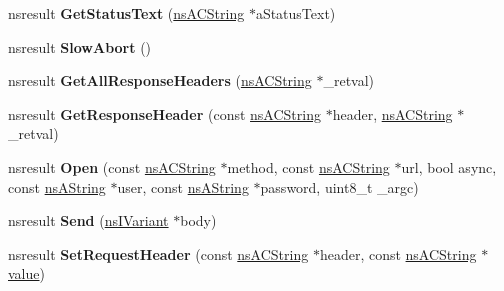 \begin{DoxyCompactItemize}
nsresult {\bfseries Get\+Status\+Text} (\hyperlink{structns_c_string_container}{ns\+A\+C\+String} $\ast$a\+Status\+Text)
\item 
\mbox{\label{interfacens_i_x_m_l_http_request_a9276d299aad0f31046fcf4e08374368f}} 
nsresult {\bfseries Slow\+Abort} ()
\item 
\mbox{\label{interfacens_i_x_m_l_http_request_a8aae5d349c54c9f1958d7d6eb3cc49e7}} 
nsresult {\bfseries Get\+All\+Response\+Headers} (\hyperlink{structns_c_string_container}{ns\+A\+C\+String} $\ast$\+\_\+retval)
\item 
\mbox{\label{interfacens_i_x_m_l_http_request_ad46c0abb2d4012247f55c62554627a79}} 
nsresult {\bfseries Get\+Response\+Header} (const \hyperlink{structns_c_string_container}{ns\+A\+C\+String} $\ast$header, \hyperlink{structns_c_string_container}{ns\+A\+C\+String} $\ast$\+\_\+retval)
\item 
\mbox{\label{interfacens_i_x_m_l_http_request_a2fb4c6c329fd5a16dec6fb1c5531b272}} 
nsresult {\bfseries Open} (const \hyperlink{structns_c_string_container}{ns\+A\+C\+String} $\ast$method, const \hyperlink{structns_c_string_container}{ns\+A\+C\+String} $\ast$url, bool async, const \hyperlink{structns_string_container}{ns\+A\+String} $\ast$user, const \hyperlink{structns_string_container}{ns\+A\+String} $\ast$password, uint8\+\_\+t \+\_\+argc)
\item 
\mbox{\label{interfacens_i_x_m_l_http_request_a5717e2ee4acadbdcaca5d36292fc221d}} 
nsresult {\bfseries Send} (\hyperlink{interfacens_i_variant}{ns\+I\+Variant} $\ast$body)
\item 
\mbox{\label{interfacens_i_x_m_l_http_request_a8338341c895d1c54e90582517a57d5fa}} 
nsresult {\bfseries Set\+Request\+Header} (const \hyperlink{structns_c_string_container}{ns\+A\+C\+String} $\ast$header, const \hyperlink{structns_c_string_container}{ns\+A\+C\+String} $\ast$\hyperlink{unionvalue}{value})
\item 
\mbox{\label{interfacens_i_x_m_l_http_request_a2e432b4d8279f3c1a0150c5424c63ac2}} 

\end{DoxyCompactItemize}
